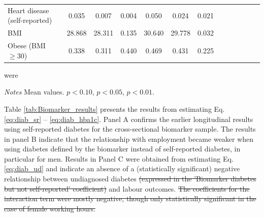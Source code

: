 \documentclass[12pt,english]{article}
\providecommand{\DIFaddtex}[1]{{\protect\color{blue}#1}} %
\providecommand{\DIFdeltex}[1]{{\protect\color{red}\sout{#1}}}                      %
\providecommand{\DIFdelbegin}{} %
\providecommand{\DIFdelend}{} %
\providecommand{\DIFaddFL}[1]{\DIFadd{#1}} %
\providecommand{\DIFaddbeginFL}{} %
\providecommand{\DIFaddendFL}{} %
\providecommand{\DIFadd}[1]{\texorpdfstring{\DIFaddtex{#1}}{#1}} %
\providecommand{\DIFdel}[1]{\texorpdfstring{\DIFdeltex{#1}}{}} %
\begin{document}
\begin{table}[!ht]
\begin{center}
\begin{adjustbox}{max width=\linewidth}
\begin{threeparttable}
{\begin{tabular}{l*{6}{S S}}
						Heart disease (self-reported)      &       0.035&       0.007&       0.004&       0.050&       0.024&       0.021\\
						BMI     &      28.868&      28.311&       0.135&      30.640&      29.778&       0.032\\
						Obese (BMI $\geq 30$)&       0.338&       0.311&       0.440&       0.469&       0.431&       0.225\\
						\bottomrule
					\end{tabular}\DIFaddbeginFL \DIFaddFL{were
					}\DIFaddendFL \begin{tablenotes}
						\item \footnotesize \textit{Notes} Mean values. \sym{*} \(p<0.10\), \sym{**} \(p<0.05\), \sym{***} \(p<0.01\).
					\end{tablenotes}
				}
			\end{threeparttable}
		\end{adjustbox}
	\end{center}
\end{table}


Table \ref{tab:Biomarker_results} presents the results from estimating Eq. \ref{eq:diab_sr} -- \ref{eq:diab_hba1c}. Panel A confirms the earlier longitudinal results using self-reported diabetes for the cross-sectional biomarker sample. The results in panel B indicate that the relationship with employment became weaker when using diabetes defined by the biomarker instead of self-reported diabetes, in particular for men. Results in Panel C were obtained from estimating Eq. \ref{eq:diab_ud} and indicate an absence of a (statistically significant) negative relationship between undiagnosed diabetes \DIFdelbegin \DIFdel{(expressed in the 'Biomarker diabetes but not self-reported' coefficient) }\DIFdelend and labour outcomes. 
\DIFdelbegin \DIFdel{The coefficients for the interaction term were mostly negative, though only statistically significant in the case of female working hours. 
}\DIFdelend 
\end{document}
